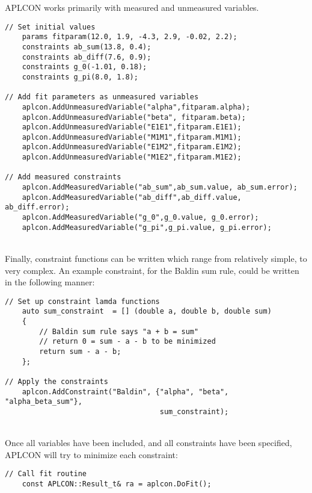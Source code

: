 \documentclass[]{article}
\begin{document}
\newpage
\noindent APLCON works primarily with measured and unmeasured variables. 

\begin{lstlisting}
// Set initial values
    params fitparam(12.0, 1.9, -4.3, 2.9, -0.02, 2.2);
    constraints ab_sum(13.8, 0.4);
    constraints ab_diff(7.6, 0.9);
    constraints g_0(-1.01, 0.18);
    constraints g_pi(8.0, 1.8);

// Add fit parameters as unmeasured variables
    aplcon.AddUnmeasuredVariable("alpha",fitparam.alpha);
    aplcon.AddUnmeasuredVariable("beta", fitparam.beta);
    aplcon.AddUnmeasuredVariable("E1E1",fitparam.E1E1);
    aplcon.AddUnmeasuredVariable("M1M1",fitparam.M1M1);
    aplcon.AddUnmeasuredVariable("E1M2",fitparam.E1M2);
    aplcon.AddUnmeasuredVariable("M1E2",fitparam.M1E2);
    
// Add measured constraints
    aplcon.AddMeasuredVariable("ab_sum",ab_sum.value, ab_sum.error);
    aplcon.AddMeasuredVariable("ab_diff",ab_diff.value, ab_diff.error);
    aplcon.AddMeasuredVariable("g_0",g_0.value, g_0.error);
    aplcon.AddMeasuredVariable("g_pi",g_pi.value, g_pi.error);
\end{lstlisting}

\noindent \\Finally, constraint functions can be written which range from relatively simple, to very complex. An example constraint, for the Baldin sum rule, could be written in the following manner: \\

\begin{lstlisting}
// Set up constraint lamda functions
    auto sum_constraint  = [] (double a, double b, double sum)  
    {
	    // Baldin sum rule says "a + b = sum"
	    // return 0 = sum - a - b to be minimized
	    return sum - a - b;  
    };

// Apply the constraints
    aplcon.AddConstraint("Baldin", {"alpha", "beta", "alpha_beta_sum"},
								    sum_constraint);
\end{lstlisting}

\noindent \\ Once all variables have been included, and all constraints have been specified, APLCON will try to minimize each constraint: \\

\begin{lstlisting}
// Call fit routine
    const APLCON::Result_t& ra = aplcon.DoFit();
\end{lstlisting}
\end{document}
